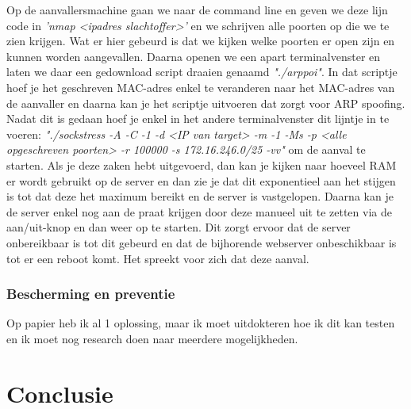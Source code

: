 \documentclass[pdftex,a4paper,12pt]{report}
\begin{document}
Op de aanvallersmachine gaan we naar de command line en geven we deze lijn code in \textit{'nmap <ipadres slachtoffer>'} en we schrijven alle poorten op die we te zien krijgen. Wat er hier gebeurd is dat we kijken welke poorten er open zijn en kunnen worden aangevallen. Daarna openen we een apart terminalvenster en laten we daar een gedownload script draaien genaamd \textit{"./arppoi"}. In dat scriptje hoef je het geschreven MAC-adres enkel te veranderen naar het MAC-adres van de aanvaller en daarna kan je het scriptje uitvoeren dat zorgt voor ARP spoofing. Nadat dit is gedaan hoef je enkel in het andere terminalvenster dit lijntje in te voeren: \textit{"./sockstress -A -C -1 -d <IP van target> -m -1 -Ms -p <alle opgeschreven poorten> -r 100000 -s 172.16.246.0/25 -vv"} om de aanval te starten. Als je deze zaken hebt uitgevoerd, dan kan je kijken naar hoeveel RAM er wordt gebruikt op de server en dan zie je dat dit exponentieel aan het stijgen is tot dat deze het maximum bereikt en de server is vastgelopen. Daarna kan je de server enkel nog aan de praat krijgen door deze manueel uit te zetten via de aan/uit-knop en dan weer op te starten. Dit zorgt ervoor dat de server onbereikbaar is tot dit gebeurd en dat de bijhorende webserver onbeschikbaar is tot er een reboot komt. Het spreekt voor zich dat deze aanval.

\subsection{Bescherming en preventie}
Op papier heb ik al 1 oplossing, maar ik moet uitdokteren hoe ik dit kan testen en ik moet nog research doen naar meerdere mogelijkheden.




\chapter{Conclusie}
\label{ch:conclusie}

\lipsum[76-80]






\listoffigures
\listoftables
\end{document}
